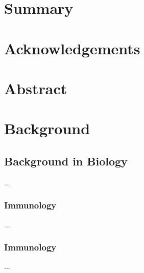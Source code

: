 \documentclass[12pt,a4paper]{report}
\begin{document}
\chapter*{Summary}

\chapter*{Acknowledgements}

\chapter*{Abstract}


\chapter{Background}

\section{Background in Biology}

...

\subsection{Immunology}

...

\subsection{Immunology}

...
\end{document}
